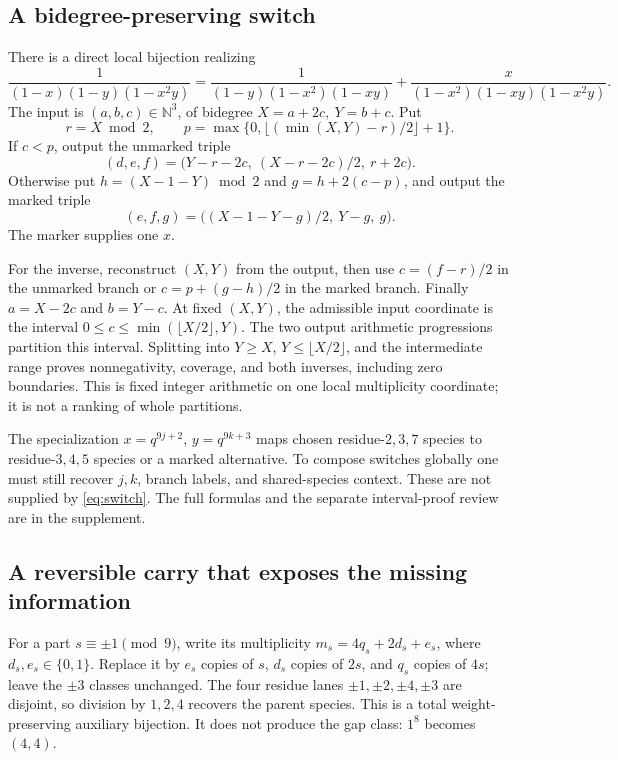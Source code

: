 \documentclass[11pt,a4paper]{article}
\theoremstyle{definition}
\newcommand{\NN}{\mathbb N}
\begin{document}
\subsection{A bidegree-preserving switch}

There is a direct local bijection realizing
\begin{equation}\label{eq:switch}
\frac1{(1-x)(1-y)(1-x^2y)}
=\frac1{(1-y)(1-x^2)(1-xy)}
 +\frac{x}{(1-x^2)(1-xy)(1-x^2y)}.
\end{equation}
The input is $(a,b,c)\in\NN^3$, of bidegree
$X=a+2c,\ Y=b+c$. Put
\[
r=X\bmod2,\qquad p=\max\{0,\lfloor(\min(X,Y)-r)/2\rfloor+1\}.
\]
If $c<p$, output the unmarked triple
\[
(d,e,f)=\bigl(Y-r-2c,\ (X-r-2c)/2,\ r+2c\bigr).
\]
Otherwise put $h=(X-1-Y)\bmod2$ and
$g=h+2(c-p)$, and output the marked triple
\[
(e,f,g)=\bigl((X-1-Y-g)/2,\ Y-g,\ g\bigr).
\]
The marker supplies one $x$.

For the inverse, reconstruct $(X,Y)$ from the output, then use
$c=(f-r)/2$ in the unmarked branch or $c=p+(g-h)/2$ in the marked branch.
Finally $a=X-2c$ and $b=Y-c$. At fixed $(X,Y)$, the admissible input
coordinate is the interval $0\le c\le\min(\lfloor X/2\rfloor,Y)$.
The two output arithmetic progressions partition this interval. Splitting
into $Y\ge X$, $Y\le\lfloor X/2\rfloor$, and the intermediate range proves
nonnegativity, coverage, and both inverses, including zero boundaries.
This is fixed integer arithmetic on one local multiplicity coordinate;
it is not a ranking of whole partitions.

The specialization $x=q^{9j+2}$, $y=q^{9k+3}$ maps chosen
residue-$2,3,7$ species to residue-$3,4,5$ species or a marked alternative.
To compose switches globally one must still recover $j,k$, branch labels,
and shared-species context. These are not supplied by \eqref{eq:switch}.
The full formulas and the separate interval-proof review are in the supplement.

\subsection{A reversible carry that exposes the missing information}

For a part $s\equiv\pm1\pmod9$, write its multiplicity
$m_s=4q_s+2d_s+e_s$, where $d_s,e_s\in\{0,1\}$.
Replace it by $e_s$ copies of $s$, $d_s$ copies of $2s$, and $q_s$ copies
of $4s$; leave the $\pm3$ classes unchanged. The four residue lanes
$\pm1,\pm2,\pm4,\pm3$ are disjoint, so division by $1,2,4$ recovers the
parent species. This is a total weight-preserving auxiliary bijection.
It does not produce the gap class: $1^8$ becomes $(4,4)$.
\end{document}
